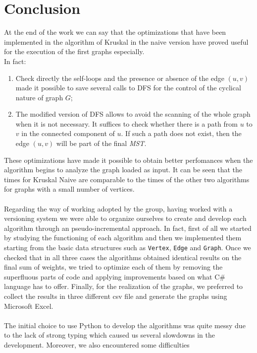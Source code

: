 \section{Conclusion}
At the end of the work we can say that the optimizations that have been implemented 
in the algorithm of Kruskal in the naive version have proved useful for the execution 
of the first graphs especially. \\
\noindent
In fact:
\begin{enumerate}
    \item Check directly the self-loops and the presence or absence of the edge $(u, v)$ 
    made it possible to save several calls to DFS for the control of the cyclical nature of graph $G$;
    \item The modified version of DFS allows to avoid the scanning of the whole graph when 
    it is not necessary. It suffices to check whether there is a path from $u$ to $v$ in the 
    connected component of $u$. If such a path does not exist, then the edge $(u, v)$ will be part 
    of the final \textit{MST}.
\end{enumerate}
\noindent
These optimizations have made it possible to obtain better perfomances when the algorithm begins to 
analyze the graph loaded as input. It can be seen that the times for Kruskal Naive are comparable to 
the times of the other two algorithms for graphs with a small number of vertices. \\
\\
\noindent
Regarding the way of working adopted by the group, having worked with a versioning system we were able 
to organize ourselves to create and develop each algorithm through an pseudo-incremental approach. 
In fact, first of all we started by studying the functioning of each algorithm and then we implemented 
them starting from the basic data structures such as \verb|Vertex|, \verb|Edge| and \verb|Graph|. 
Once we checked that in all three cases the algorithms obtained identical results on the final sum of 
weights, we tried to optimize each of them by removing the superfluous parts of code and applying 
improvements based on what C\# language has to offer. Finally, for the realization of the graphs, 
we preferred to collect the results in three different csv file and generate the graphs using Microsoft Excel. \\
\\
\noindent
The initial choice to use Python to develop the algorithms was quite messy due to the lack of strong 
typing which caused us several slowdowns in the development. Moreover, we also encountered some difficulties 
